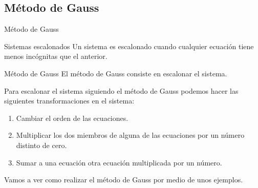 \documentclass[9pt]{beamer}
\begin{document}
\subsection{Método de Gauss}

\begin{frame}{Método de Gauss}
\begin{alertblock}{Sistemas escalonados}
Un sistema es escalonado cuando cualquier ecuación tiene menos incógnitas que el anterior.

\end{alertblock}
\pause

\begin{alertblock}{Método de Gauss}
El método de Gauss consiste en escalonar el sistema. 
\pause

Para escalonar el sistema siguiendo el método de Gauss podemos hacer las siguientes transformaciones en el sistema:
\pause
\begin{enumerate}[<+->]
\item Cambiar el orden de las ecuaciones.
\item Multiplicar los dos miembros de alguna de las ecuaciones por un número distinto de cero.
\item Sumar a una ecuación otra ecuación multiplicada por un número.
\end{enumerate}
\end{alertblock}
\pause

Vamos a ver como realizar el método de Gauss por medio de unos ejemplos.
\end{frame}
\end{document}
